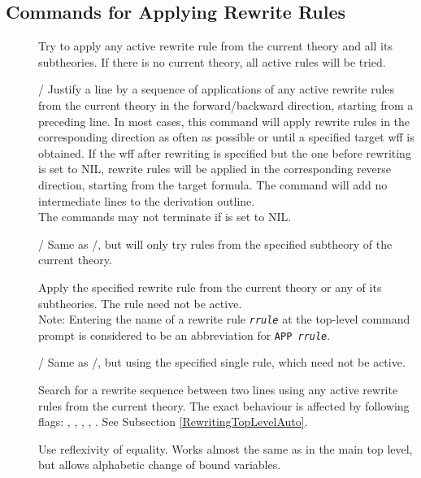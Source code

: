 \subsection{Commands for Applying Rewrite Rules}
  \begin{description}
  \item[]  Try to apply any active rewrite rule from the
    current theory and all its subtheories. If there is no current theory, all
    active rules will be tried.
  \item[] / Justify a line by a
    sequence of applications of any active rewrite rules from the current
    theory in the forward/backward direction, starting from a preceding line.
    In most cases, this command will apply rewrite rules in the corresponding
    direction as often as possible or until a specified target wff is obtained.
    If the wff after rewriting is specified but the one before rewriting is set
    to NIL, rewrite rules will be applied in the corresponding reverse
    direction, starting from the target formula. The command will add no
    intermediate lines to the derivation outline.\\
    The commands may not terminate if  is set to
    NIL.
  \item[] / Same as
    /, but will only try rules from
    the specified subtheory of the current theory.
  \item[]  Apply the specified rewrite rule from the current
    theory or any of its subtheories. The rule need not be active.\\
    Note: Entering the name of a rewrite rule \texttt{\textit{rrule}} at the
    top-level command prompt is considered to be an abbreviation for
    \texttt{APP \textit{rrule}}.
  \item[] / Same as
    /, but using the specified single
    rule, which need not be active.
  \item[]  Search for a rewrite sequence between two lines
    using any active rewrite rules from the current theory. The exact behaviour
    is affected by following flags: ,
    ,
    ,
    , .
    See Subsection \ref{RewritingTopLevelAuto}.
  \item[]  Use reflexivity of equality. Works almost the
    same as in the main top level, but allows alphabetic change of bound
    variables.
  \end{description}

